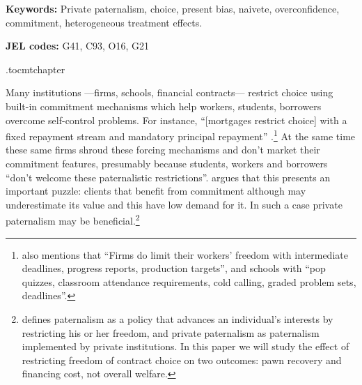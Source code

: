 \documentclass[oneside,11pt]{article}
\begin{document}
\vspace{.3in}

\textbf{Keywords: } Private paternalism, choice, present bias, naivete, overconfidence, commitment, heterogeneous treatment effects.

\textbf{JEL codes:} G41, C93, O16, G21

\newpage

\etocdepthtag.toc{mtchapter}






Many institutions ---firms, schools, financial contracts--- restrict choice using built-in commitment mechanisms which help workers, students, borrowers overcome self-control problems. For instance, ``[mortgages restrict choice] with a fixed repayment stream and mandatory principal repayment'' \citep{Laibson2018}.\footnote{\cite{Laibson2018} also mentions that ``Firms do limit their workers' freedom with intermediate deadlines, progress reports, production targets'', and schools with ``pop quizzes, classroom attendance requirements, cold calling, graded problem sets, deadlines''.} At the same time  these same firms shroud these forcing mechanisms and don't market their commitment features, presumably because students, workers and borrowers ``don't welcome these paternalistic restrictions''. \cite{Laibson2018} argues that this presents an important puzzle: clients that benefit from commitment although may underestimate its value and this have low demand for it. In such a case private paternalism may be beneficial.\footnote{\cite{Laibson2018} defines paternalism as a policy that advances an individual's interests by restricting his or her freedom, and private paternalism as paternalism implemented by private institutions. In this paper we will study the effect of restricting freedom of contract choice on two outcomes: pawn recovery and financing cost, not overall welfare.} 
\end{document}

